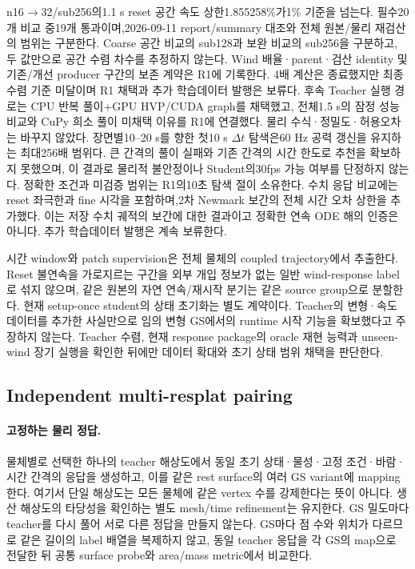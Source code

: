 \documentclass[11pt]{article}
\begin{document}
n16$\to$32/sub256의1.1 s reset 공간 속도 상한1.855258\%가1\% 기준을 넘는다.
필수20개 비교 중19개 통과이며,2026-09-11 report/summary 대조와 전체 원본/물리 재검산의 범위는 구분한다.
Coarse 공간 비교의 sub128과 보완 비교의 sub256을 구분하고, 두 값만으로 공간 수렴 차수를 추정하지 않는다.
Wind 배율·parent·검산 identity 및 기존/개선 producer 구간의 보존 계약은 R1에 기록한다.
4배 계산은 종료했지만 최종 수렴 기준 미달이며 R1 채택과 추가 학습데이터 발행은 보류다.
후속 Teacher 실행 경로는 CPU 반복 풀이+GPU HVP/CUDA graph를 채택했고, 전체1.5 s의 잠정 성능
비교와 CuPy 희소 풀이 미채택 이유를 R1에 연결했다. 물리 수식·정밀도·허용오차는 바꾸지 않았다.
장면별10--20 s를 향한 첫10 s \(\Delta t\) 탐색은60 Hz 공력 갱신을 유지하는 최대256배 범위다.
큰 간격의 풀이 실패와 기존 간격의 시간 한도로 추천을 확보하지 못했으며, 이 결과로 물리적 불안정이나
Student의30fps 가능 여부를 단정하지 않는다. 정확한 조건과 미검증 범위는 R1의10초 탐색 절이 소유한다.
수치 응답 비교에는 reset 좌극한과 fine 시각을 포함하며,2차 Newmark 보간의 전체 시간 오차 상한을
추가했다. 이는 저장 수치 궤적의 보간에 대한 결과이고 정확한 연속 ODE 해의 인증은 아니다.
추가 학습데이터 발행은 계속 보류한다.

시간 window와 patch supervision은 전체 물체의 coupled trajectory에서 추출한다.
Reset 불연속을 가로지르는 구간을 외부 개입 정보가 없는 일반 wind-response label로 섞지 않으며,
같은 원본의 자연 연속/재시작 분기는 같은 source group으로 분할한다.
현재 setup-once student의 상태 초기화는 별도 계약이다. Teacher의 변형·속도 데이터를 추가한 사실만으로
임의 변형 GS에서의 runtime 시작 기능을 확보했다고 주장하지 않는다.
Teacher 수렴, 현재 response package의 oracle 재현 능력과 unseen-wind 장기 실행을 확인한 뒤에만
데이터 확대와 초기 상태 범위 채택을 판단한다.

\subsection{Independent multi-resplat pairing}

\paragraph{고정하는 물리 정답.}
물체별로 선택한 하나의 teacher 해상도에서 동일 초기 상태·물성·고정 조건·바람·시간 간격의 응답을
생성하고, 이를 같은 rest surface의 여러 GS variant에 mapping한다. 여기서 단일 해상도는 모든
물체에 같은 vertex 수를 강제한다는 뜻이 아니다. 생산 해상도의 타당성을 확인하는 별도 mesh/time
refinement는 유지한다. GS 밀도마다 teacher를 다시 풀어 서로 다른 정답을 만들지 않는다.
GS마다 점 수와 위치가 다르므로 같은 길이의 label 배열을 복제하지 않고, 동일 teacher 응답을
각 GS의 map으로 전달한 뒤 공통 surface probe와 area/mass metric에서 비교한다.
\end{document}
